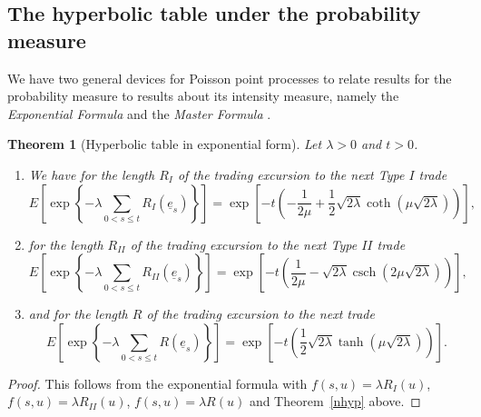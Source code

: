 \documentclass[11pt]{scrartcl}
\newtheorem{theorem}{Theorem}
\DeclareMathOperator{\csch}{csch}
\begin{document}
\subsection{The hyperbolic table under the probability measure}

We have two general devices for Poisson point processes to relate results
for the probability measure to results about its intensity measure, namely
the \emph{Exponential Formula} \cite[Prop.XII.1.12, p.476]{RY} and 
the \emph{Master Formula} \cite[Prop.XII.1.10 and Corl.XII.1.11, p.475]{RY}. 

\begin{theorem}[Hyperbolic table in exponential form]\label{hypexp}
Let $\lambda>0$ and $t>0$.

\begin{enumerate}
\item We have for the length $R_{I}$ of the trading excursion to the next
Type $I$ trade 
\begin{equation}
E\left[ \exp \left\{ -\lambda \sum_{0<s\leq t}R_{I}(\underline{e}_{s})\right\} \right] =\exp \left[ -t\left( -\frac{1}{2\mu }+\frac{1}{2}\sqrt{2\lambda }\coth (\mu \sqrt{2\lambda })\right) \right] ,
\end{equation}

\item for the length $R_{II}$ of the trading excursion to the next Type $II$
trade 
\begin{equation}
E\left[ \exp \left\{ -\lambda \sum_{0<s\leq t}R_{II}(\underline{e}_{s})\right\} \right] =\exp \left[ -t\left( \frac{1}{2\mu }-\sqrt{2\lambda}\csch(2\mu \sqrt{2\lambda })\right) \right] ,
\end{equation}

\item and for the length $R$ of the trading excursion to the next trade 
\begin{equation}
E\left[ \exp \left\{ -\lambda \sum_{0<s\leq t}R(\underline{e}_{s})\right\} \right] =\exp \left[ -t\left( \frac{1}{2}\sqrt{2\lambda }\tanh (\mu \sqrt{2\lambda })\right) \right] .
\end{equation}
\end{enumerate}
\end{theorem}

\begin{proof}
This follows from the exponential formula with $f(s,u)=\lambda R_{I}(u)$, $f(s,u)=\lambda R_{II}(u)$, $f(s,u)=\lambda R(u)$
and Theorem~\ref{nhyp} above.
\end{proof}
\end{document}

